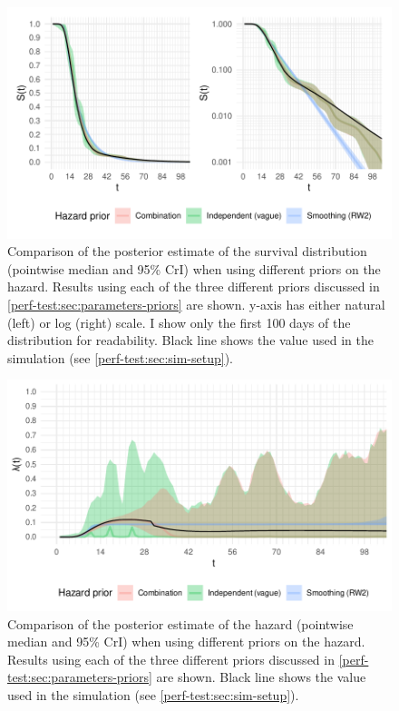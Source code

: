 \documentclass[thesis.tex]{subfiles}
\begin{document}
\begin{figure}
  \centering \includegraphics{cis-perfect-testing/survival-results}
  \caption[Comparison of survival function estimates under different priors]{Comparison of the posterior estimate of the survival distribution (pointwise median and 95\% CrI) when using different priors on the hazard. Results using each of the three different priors discussed in \cref{perf-test:sec:parameters-priors} are shown. y-axis has either natural (left) or log (right) scale. I show only the first 100 days of the distribution for readability. Black line shows the value used in the simulation (see \cref{perf-test:sec:sim-setup}). \label{perf-test:fig:survival-results}}
\end{figure}

\begin{figure}
  \centering \includegraphics{cis-perfect-testing/hazard-results}
  \caption[Comparison of hazard estimates under different priors]{Comparison of the posterior estimate of the hazard (pointwise median and 95\% CrI) when using different priors on the hazard. Results using each of the three different priors discussed in \cref{perf-test:sec:parameters-priors} are shown. Black line shows the value used in the simulation (see \cref{perf-test:sec:sim-setup}). \label{perf-test:fig:hazard-results}}
\end{figure}
\end{document}
